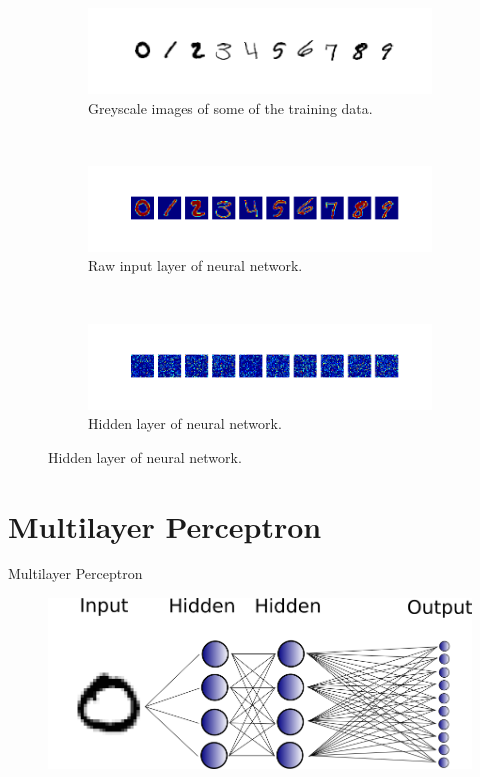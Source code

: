 \begin{frame}[plain]
\begin{figure}\vspace{-0.5cm}
\begin{subfigure}{0.90\textwidth}
\includegraphics[width=\textwidth]{nn_demo_input_grey}
\caption{Greyscale images of some of the training data.}
\end{subfigure}\\
\begin{subfigure}{0.90\textwidth}
\includegraphics[width=\textwidth]{nn_demo_input}
\caption{Raw input layer of neural network.}
\end{subfigure}\\
\begin{subfigure}{0.90\textwidth}
\includegraphics[width=\textwidth]{nn_demo_hidden}
\caption{Hidden layer of neural network.}
\end{subfigure}
\end{figure}
\end{frame}


\section{Multilayer Perceptron}


\begin{frame}[plain]{Multilayer Perceptron}
\begin{figure}
\includegraphics[width = 0.8 \textwidth]{"mlp all lines"}
\end{figure}
\end{frame}

